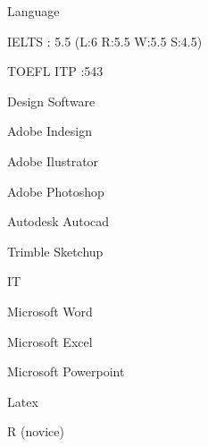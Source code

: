 
\begin{cvskills}
\cvskill
    {Language}
    {
      \begin{cvitems} %
        \item {IELTS : 5.5 (L:6 R:5.5 W:5.5 S:4.5)}
        \item{TOEFL ITP :543}
      \end{cvitems}
      }

\cvskill
    {Design Software}
    {
      \begin{cvitemsplus} %
        \item {Adobe Indesign}
        \item{Adobe Ilustrator}
        \item{Adobe Photoshop}
        \item{Autodesk Autocad}
        \item{Trimble Sketchup}
      \end{cvitemsplus}
      }
\cvskill
    {IT}
    {
      \begin{cvitemsplus} %
        \item {Microsoft Word}
        \item{Microsoft Excel}
        \item{Microsoft Powerpoint}
        \item{Latex}
        \item{R (novice)}
      \end{cvitemsplus}
      }

\end{cvskills}


